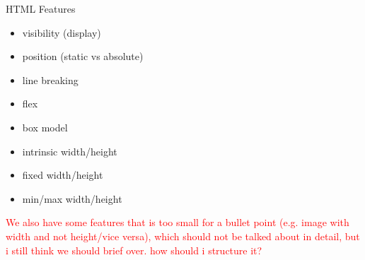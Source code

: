 \documentclass[format=acmsmall, review=false, screen=true]{acmart}
\newcommand\todo[1]{\textcolor{red}{#1}}
\begin{document}
HTML Features

\begin{itemize}
	\item visibility (display)
	\item position (static vs absolute)
	\item line breaking
	\item flex
	\item box model
	\item intrinsic width/height
	\item fixed width/height
	\item min/max width/height
\end{itemize}

\todo{We also have some features that is too small for a bullet point (e.g. image with width and not height/vice versa), which should not be talked about in detail, but i still think we should brief over. how should i structure it?}
\end{document}
